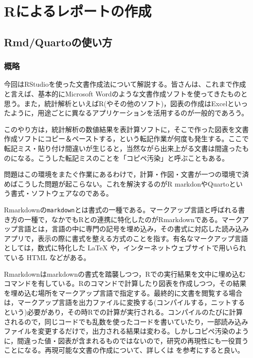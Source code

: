 \documentclass[
  a4paper,
]{ltjsbook}
\begin{document}

\chapter{Rによるレポートの作成}\label{rux306bux3088ux308bux30ecux30ddux30fcux30c8ux306eux4f5cux6210}

\section{Rmd/Quartoの使い方}\label{rmdquartoux306eux4f7fux3044ux65b9}

\subsection{概略}\label{ux6982ux7565}

今回はRStudioを使った文書作成法について解説する。皆さんは、これまで作成と言えば、基本的にMicrosoft
Wordのような文書作成ソフトを使ってきたものと思う。また，統計解析といえばR(やその他のソフト)，図表の作成はExcelといったように，用途ごとに異なるアプリケーションを活用するのが一般的であろう。

このやり方は，統計解析の数値結果を表計算ソフトに，そこで作った図表を文書作成ソフトにコピー＆ペーストする，という転記作業が何度も発生する。ここで転記ミス・貼り付け間違いが生じると，当然ながら出来上がる文書は間違ったものになる。こうした転記ミスのことを「コピペ汚染」と呼ぶこともある。

問題はこの環境をまたぐ作業にあるわけで，計算・作図・文書が一つの環境で済めばこうした問題が起こらない。これを解決するのがR
markdonやQuartoという書式・ソフトウェアなのである。

Rmarkdownの\texttt{markdown}とは書式の一種である。マークアップ言語と呼ばれる書き方の一種で，なかでもRとの連携に特化したのがRmarkdownである。マークアップ言語とは，言語の中に専門の記号を埋め込み，その書式に対応した読み込みアプリで，表示の際に書式を整える方式のことを指す。有名なマークアップ言語としては，数式に特化した
LaTeX や，インターネットウェブサイトで用いられている HTML などがある。

Rmarkdownはmarkdownの書式を踏襲しつつ，Rでの実行結果を文中に埋め込むコマンドを有している。Rのコマンドで計算したり図表を作成しつつ，その結果を埋め込む場所をマークアップ言語で指定する。最終的に文書を閲覧する場合は，マークアップ言語を出力ファイルに変換する(コンパイルする，ニットするという)必要があり，その時Rでの計算が実行される。コンパイルのたびに計算されるので，同じコードでも乱数を使ったコードを書いていたり，一部読み込みファイルを変更するだけで，出力される結果は変わる。しかしコピペ汚染のように，間違った値・図表が含まれるものではないので，研究の再現性にも一役買うことになる。再現可能な文書の作成について、詳しくは
\textcite{Takahashi201805} を参考にすると良い。
\end{document}
